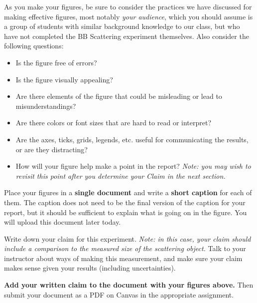 \documentclass[11pt]{article}
\begin{document}
As you make your figures, be sure to consider the practices we have discussed for making effective figures, most notably \textit{your audience}, which you should assume is a group of students with similar background knowledge to our class, but who have not completed the BB Scattering experiment themselves. Also consider the following questions:
\begin{itemize}
 \item Is the figure free of errors?
 \item Is the figure visually appealing?
 \item Are there elements of the figure that could be misleading or lead to misunderstandings?
 \item Are there colors or font sizes that are hard to read or interpret?
 \item Are the axes, ticks, grids, legends, etc. useful for communicating the results, or are they distracting?
 \item How will your figure help make a point in the report? \textit{Note: you may wish to revisit this point after you determine your Claim in the next section.}
\end{itemize}


Place your figures in a \textbf{single document} and write a \textbf{short caption} for each of them. The caption does not need to be the final version of the caption for your report, but it should be sufficient to explain what is going on in the figure. You will upload this document later today.

\vspace{5mm}


\vspace{3mm}

Write down your claim for this experiment.  \textit{Note: in this case, your claim should include
  a comparison to the measured size of the scattering object.} Talk to your instructor about ways of making this measurement, and make sure your claim makes sense given your results (including uncertainties).
  
  \textbf{Add your written claim to the document with your figures above.} Then submit your document as a PDF on Canvas in the appropriate assignment.

\vspace{5mm}


\vspace{3mm}
\end{document}
